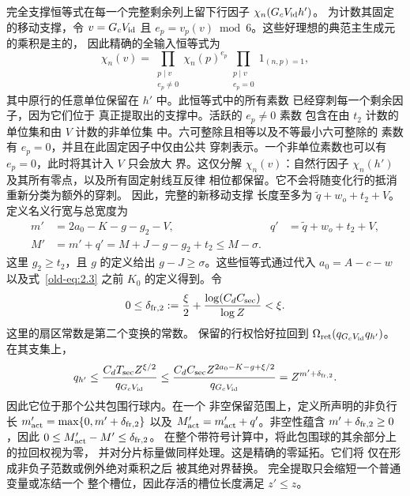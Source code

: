 \documentclass[11pt,a4paper]{article}
\numberwithin{equation}{section}
\numberwithin{figure}{section}
\theoremstyle{definition}
\theoremstyle{remark}
\begin{document}
完全支撑恒等式在每一个完整剩余列上留下行因子
\(\chi_n(G_cV_{\rm id}h')\)。
为计数其固定的移动支撑，令 \(v=G_cV_{\rm id}\) 且
\(e_p=v_p(v)\bmod 6\)。这些好理想的典范主生成元的乘积是主的，
因此精确的全输入恒等式为
\[
 \chi_n(v)=
   \prod_{\substack{p\mid v\\e_p\ne0}}\chi_n(p)^{e_p}
   \prod_{\substack{p\mid v\\e_p=0}}1_{(n,p)=1},
\]
其中原行的任意单位保留在 \(h'\) 中。此恒等式中的所有素数
已经穿刺每一个剩余因子，因为它们位于
真正提取出的支撑中。活跃的 \(e_p\ne0\) 素数
包含在由 \(t_2\) 计数的单位集和由 \(V\) 计数的非单位集
中。六可整除且相等以及不等最小六可整除的
素数有 \(e_p=0\)，并且在此固定因子中仅由公共
穿刺表示。一个非单位素数也可以有
\(e_p=0\)，此时将其计入 \(V\) 只会放大
界。这仅分解 \(\chi_n(v)\)：自然行因子
\(\chi_n(h')\) 及其所有零点，以及所有固定射线互反律
相位都保留。它不会将随变化行的抵消重新分类为额外的穿刺。
因此，完整的新移动支撑
长度至多为 \(\widetilde q+w_o+t_2+V\)。定义名义行宽与总宽度为
\begin{equation}
 \begin{aligned}
 m'&=2a_0-K-g-g_2-V,&
 q'&=\widetilde q+w_o+t_2+V,\\
 M'&=m'+q'
    =M+J-g-g_2+t_2
    \le M-\sigma.
 \end{aligned}
 \label{old-eq:2.13}
\end{equation}
这里 \(g_2\ge t_2\)，且 \(g\) 的定义给出
\(g-J\ge\sigma\)。这些恒等式通过代入
\(a_0=A-c-w\) 以及式~\eqref{old-eq:2.3} 之前 \(K_0\) 的定义得到。令
\[
 0\le\delta_{{\rm fr},2}:=\frac\xi2+
       \frac{\log(C_dC_{\rm sec})}{\log Z}<\xi.
\]
这里的扇区常数是第二个变换的常数。
保留的行权恰好拉回到
\(\Omega_{\rm ret}(q_{G_cV_{\rm id}}q_{h'})\)。在其支集上，
\[
 q_{h'}\le
 \frac{C_dT_{\rm sec}Z^{\xi/2}}{q_{G_cV_{\rm id}}}
 \le\frac{C_dC_{\rm sec}Z^{2a_0-K-g+\xi/2}}
          {q_{G_cV_{\rm id}}}
 =Z^{m'+\delta_{{\rm fr},2}}.
\]
因此它位于那个公共包围行球内。在一个
非空保留范围上，定义所声明的非负行长
\(m'_{\rm act}=\max\{0,m'+\delta_{{\rm fr},2}\}\) 以及
\(M'_{\rm act}=m'_{\rm act}+q'\)。非空性蕴含
\(m'+\delta_{{\rm fr},2}\ge0\)，因此
\(0\le M'_{\rm act}-M'\le\delta_{{\rm fr},2}\)。
在整个带符号计算中，将此包围球的其余部分上的拉回权视为零，
并对分片标量做同样处理。这是精确的零延拓。它们将
仅在形成非负子范数或例外绝对乘积之后
被其绝对界替换。
完全提取只会缩短一个普通变量或冻结一个
整个槽位，因此存活的槽位长度满足 \(z'\le z\)。
\end{document}

